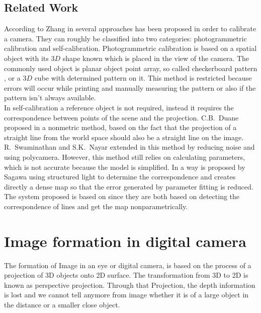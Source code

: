\documentclass[journal,final,a4paper,twoside]{PS}
\begin{document}
\subsection{Related Work}
\label{sec:related}
According to Zhang in \cite{Zhang} several approaches has been proposed in order to calibrate a camera. They can roughly be classified into two categories: photogrammetric calibration and self-calibration.
Photogrammetric calibration is based on a spatial object with its $3D$ shape known which is placed in the view of the camera. The commonly used object is planar object point array, so called checkerboard pattern \cite{Zhang}, or a $3D$ cube with determined pattern on it. This method is restricted because errors will occur while printing and manually measuring the pattern or also if the pattern isn't always available.\\
In self-calibration \cite{Faugeras} a reference object is not required, instead it requires the correspondence between points of the scene and the projection. C.B.~Duane proposed in \cite{Duane} a nonmetric method, based on the fact that the projection of a straight line from the world space should also be a straight line on the image. R.~Swaminathan and S.K.~Nayar extended in \cite{Swaminathan} this method by reducing noise and using polycamera. However, this method still relies on calculating parameters, which is not accurate because the model is simplified. 
In \cite{Sagawa} a way is proposed by Sagawa using structured light to determine the correspondence and creates directly a dense map so that the error generated by parameter fitting is reduced. 
The system proposed is based on \cite{Sagawa} since they are both based on detecting the correspondence of lines and get the map nonparametrically.







\section{Image formation in digital camera}
\label{sec:imageFormation}

The formation of Image in an eye or digital camera, is based on the process of a projection of 3D objects onto 2D surface. The transformation from 3D to 2D is known as perspective projection. Through that Projection, the depth information is lost and we cannot tell anymore from image whether it is of a large object in the distance or a smaller close object.
\end{document}
